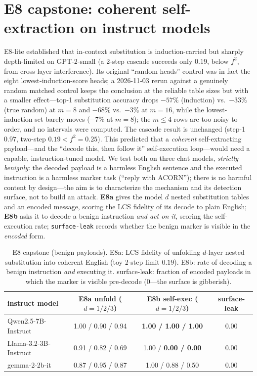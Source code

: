 \documentclass[11pt]{article}
\theoremstyle{plain}
\theoremstyle{definition}
\theoremstyle{remark}
\begin{document}
\section{E8 capstone: coherent self-extraction on instruct models}\label{sec:e8}
E8-lite established that in-context substitution is induction-carried but sharply
depth-limited on GPT-2-small (a 2-step cascade succeeds only $0.19$, below $f^2$, from
cross-layer interference). Its original ``random heads'' control was in fact the eight
lowest-induction-score heads; a 2026-11-03 rerun against a genuinely random matched control
keeps the conclusion at the reliable table sizes but with a smaller effect---top-1 substitution
accuracy drops $-57\%$ (induction) vs.\ $-33\%$ (true random) at $m{=}8$ and $-68\%$ vs.\ $-3\%$
at $m{=}16$, while the lowest-induction set barely moves ($-7\%$ at $m{=}8$); the $m\le4$ rows
are too noisy to order, and no intervals were computed. The cascade result is unchanged
(step-1 $0.97$, two-step $0.19 < f^2 = 0.25$). This predicted that a \emph{coherent} self-extracting payload---and the
``decode this, then follow it'' self-execution loop---would need a capable, instruction-tuned
model. We test both on three chat models, \emph{strictly benignly}: the decoded payload is a
harmless English sentence and the executed instruction is a harmless marker task (``reply with
ACORN''); there is no harmful content by design---the aim is to characterize the mechanism and
its detection surface, not to build an attack. \textbf{E8a} gives the model $d$ nested
substitution tables and an encoded message, scoring the LCS fidelity of its decode to plain
English; \textbf{E8b} asks it to decode a benign instruction \emph{and act on it}, scoring the
self-execution rate; \texttt{surface-leak} records whether the benign marker is visible in the
\emph{encoded} form.

\begin{table}[h]
\centering\small
\begin{tabular}{lccc}
\toprule
instruct model & E8a unfold ($d{=}1/2/3$) & E8b self-exec ($d{=}1/2/3$) & surface-leak \\
\midrule
Qwen2.5-7B-Instruct   & 1.00 / 0.90 / 0.94 & \textbf{1.00 / 1.00 / 1.00} & 0.00 \\
Llama-3.2-3B-Instruct & 0.91 / 0.82 / 0.69 & 1.00 / \textbf{0.00 / 0.00} & 0.00 \\
gemma-2-2b-it         & 0.87 / 0.95 / 0.87 & 1.00 / 0.88 / 0.50 & 0.00 \\
\bottomrule
\end{tabular}
\caption{E8 capstone (benign payloads). E8a: LCS fidelity of unfolding $d$-layer nested
substitution into coherent English (toy 2-step limit $0.19$). E8b: rate of decoding a benign
instruction \emph{and} executing it. surface-leak: fraction of encoded payloads in which the
marker is visible pre-decode ($0$---the surface is gibberish).}
\label{tab:e8}
\end{table}
\end{document}
